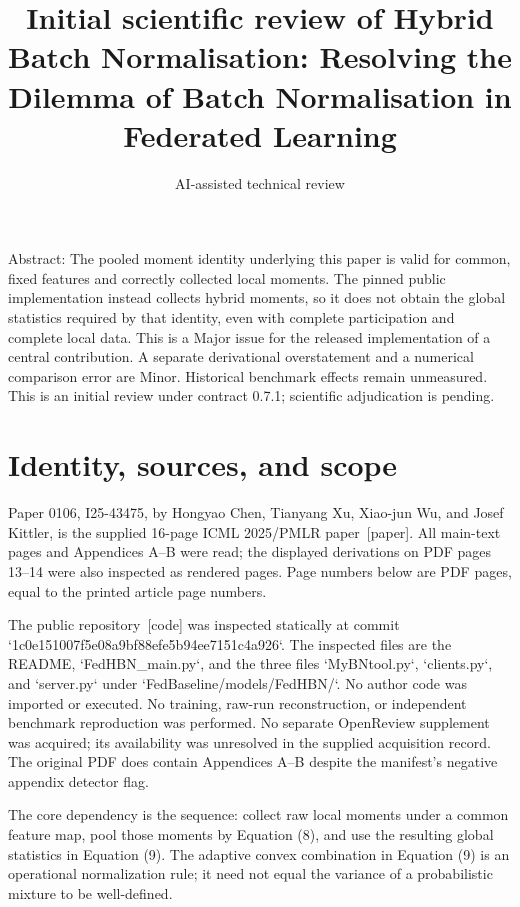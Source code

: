 \documentclass[10pt]{article}
\title{Initial scientific review of
Hybrid Batch Normalisation: Resolving the Dilemma of Batch Normalisation in Federated Learning}
\author{AI-assisted technical review}
\date{}
\begin{document}
\maketitle
Abstract: The pooled moment identity underlying this paper is valid for common, fixed features and correctly collected local moments. The pinned public implementation instead collects hybrid moments, so it does not obtain the global statistics required by that identity, even with complete participation and complete local data. This is a Major issue for the released implementation of a central contribution. A separate derivational overstatement and a numerical comparison error are Minor. Historical benchmark effects remain unmeasured. This is an initial review under contract 0.7.1; scientific adjudication is pending.\par
\section*{Identity, sources, and scope}
Paper 0106, I25-43475, by Hongyao Chen, Tianyang Xu, Xiao-jun Wu, and Josef Kittler, is the supplied 16-page ICML 2025/PMLR paper [paper]. All main-text pages and Appendices A–B were read; the displayed derivations on PDF pages 13–14 were also inspected as rendered pages. Page numbers below are PDF pages, equal to the printed article page numbers.\par
The public repository [code] was inspected statically at commit `1c0e151007f5e08a9bf88efe5b94ee7151c4a926`. The inspected files are the README, `FedHBN\_main.py`, and the three files `MyBNtool.py`, `clients.py`, and `server.py` under `FedBaseline/models/FedHBN/`. No author code was imported or executed. No training, raw-run reconstruction, or independent benchmark reproduction was performed. No separate OpenReview supplement was acquired; its availability was unresolved in the supplied acquisition record. The original PDF does contain Appendices A–B despite the manifest’s negative appendix detector flag.\par
The core dependency is the sequence: collect raw local moments under a common feature map, pool those moments by Equation (8), and use the resulting global statistics in Equation (9). The adaptive convex combination in Equation (9) is an operational normalization rule; it need not equal the variance of a probabilistic mixture to be well-defined.\par
\end{document}
